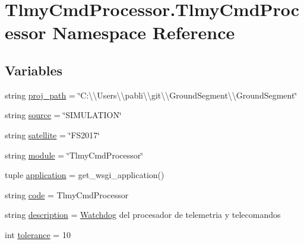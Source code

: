 \hypertarget{namespace_tlmy_cmd_processor_1_1_tlmy_cmd_processor}{}\section{Tlmy\+Cmd\+Processor.\+Tlmy\+Cmd\+Processor Namespace Reference}
\label{namespace_tlmy_cmd_processor_1_1_tlmy_cmd_processor}
\subsection*{Variables}
\begin{DoxyCompactItemize}
\item 
string \hyperlink{namespace_tlmy_cmd_processor_1_1_tlmy_cmd_processor_a9a897e168825a80d9ce9ed52e20010ef}{proj\+\_\+path} = \char`\"{}C\+:\textbackslash{}\textbackslash{}\+Users\textbackslash{}\textbackslash{}pabli\textbackslash{}\textbackslash{}git\textbackslash{}\textbackslash{}\+Ground\+Segment\textbackslash{}\textbackslash{}\+Ground\+Segment\char`\"{}
\item 
string \hyperlink{namespace_tlmy_cmd_processor_1_1_tlmy_cmd_processor_acef2a3d30bda6af9c56309eea6b12246}{source} = \char`\"{}S\+I\+M\+U\+L\+A\+T\+I\+O\+N\char`\"{}
\item 
string \hyperlink{namespace_tlmy_cmd_processor_1_1_tlmy_cmd_processor_a5cf95a9cff868554c46d7a901df74673}{satellite} = \char`\"{}F\+S2017\char`\"{}
\item 
string \hyperlink{namespace_tlmy_cmd_processor_1_1_tlmy_cmd_processor_a8f2365862c9bbb4fe399b2d3f801b4d5}{module} = \char`\"{}Tlmy\+Cmd\+Processor\char`\"{}
\item 
tuple \hyperlink{namespace_tlmy_cmd_processor_1_1_tlmy_cmd_processor_abc9fef542a08059c815604cf428eb8ea}{application} = get\+\_\+wsgi\+\_\+application()
\item 
string \hyperlink{namespace_tlmy_cmd_processor_1_1_tlmy_cmd_processor_a4b093dcc82bbec72c8869f3715934d92}{code} = \textquotesingle{}Tlmy\+Cmd\+Processor\textquotesingle{}
\item 
string \hyperlink{namespace_tlmy_cmd_processor_1_1_tlmy_cmd_processor_af826240cd995d7339c5f281ee8941333}{description} = \textquotesingle{}\hyperlink{class_ground_segment_1_1models_1_1_watchdog_1_1_watchdog}{Watchdog} del procesador de telemetria y telecomandos\textquotesingle{}
\item 
int \hyperlink{namespace_tlmy_cmd_processor_1_1_tlmy_cmd_processor_afb50f24734d74f88dacebcac995fd9f4}{tolerance} = 10

\end{DoxyCompactItemize}
